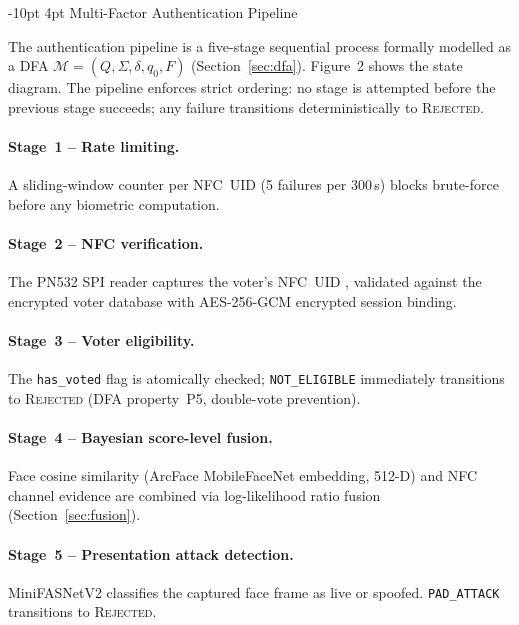\documentclass[a4paper,12pt]{article}
\makeatletter
\renewcommand\subsection{\@startsection{subsection}{2}{\z@}%
  {-10pt \@plus -3pt \@minus -2pt}{4pt \@plus 2pt}%
  {\normalfont\normalsize\itshape}}
\newcommand{\parencite}[1]{\citep{#1}}
\makeatother
\begin{document}
\subsection{Multi-Factor Authentication Pipeline}\label{sec:pipeline}

The authentication pipeline is a five-stage sequential process formally
modelled as a DFA $\mathcal{M} = (Q, \Sigma, \delta, q_0, F)$
(Section~\ref{sec:dfa}). Figure~2 shows the state diagram. The pipeline
enforces strict ordering: no stage is attempted before the previous
stage succeeds; any failure transitions deterministically to
\textsc{Rejected}.

\paragraph{Stage~1 -- Rate limiting.}
A sliding-window counter per NFC~UID (5 failures per 300\,s) blocks
brute-force before any biometric computation.

\paragraph{Stage~2 -- NFC verification.}
The PN532 SPI reader captures the voter's NFC~UID
\parencite{hasan2019nfc}, validated against the encrypted voter database
with AES-256-GCM encrypted session binding.

\paragraph{Stage~3 -- Voter eligibility.}
The \texttt{has\_voted} flag is atomically checked;
\texttt{NOT\_ELIGIBLE} immediately transitions to \textsc{Rejected}
(DFA property~P5, double-vote prevention).

\paragraph{Stage~4 -- Bayesian score-level fusion.}
Face cosine similarity (ArcFace MobileFaceNet embedding, 512-D) and NFC
channel evidence are combined via log-likelihood ratio fusion
(Section~\ref{sec:fusion}).

\paragraph{Stage~5 -- Presentation attack detection.}
MiniFASNetV2 classifies the captured face frame as live or spoofed.
\texttt{PAD\_ATTACK} transitions to \textsc{Rejected}.
\end{document}

